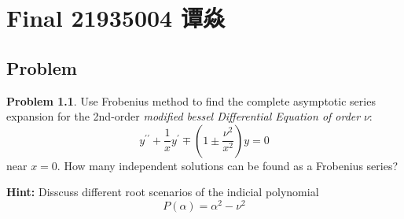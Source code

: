 \documentclass[a4paper]{book}
\makeatletter
\newcommand{\voidenvironment}[1]{%
  \expandafter\providecommand\csname env@#1@save@env\endcsname{}%
  \expandafter\providecommand\csname env@#1@process\endcsname{}%
  \@ifundefined{#1}{}{\RenewEnviron{#1}{}}%
}
\numberwithin{equation}{chapter}
\theoremstyle{definition}
\newtheorem{pro}[exm]{Problem}
\makeatother
\begin{document}
\pagestyle{empty}
% 

 \pagestyle{fancy}
 \fancyhead{}


\setcounter{chapter}{0}






\chapter{Final 21935004 谭焱}




\section{Problem}\label{sec:1}

\begin{pro}
  Use Frobenius method to find the complete asymptotic series expansion for the 2nd-order \textit{modified bessel Differential Equation of order} $\nu$:
  \[y^{\prime \prime} + \frac{1}{x} y^\prime \mp \left(1 \pm \frac{\nu^2}{x^2}\right)y = 0\]
  near $x = 0$. How many independent solutions can be found as a Frobenius series?

  \textbf{Hint:} Disscuss different root scenarios of the indicial polynomial
  \[P(\alpha) = \alpha^2 - \nu^2\]
\end{pro}
\end{document}
